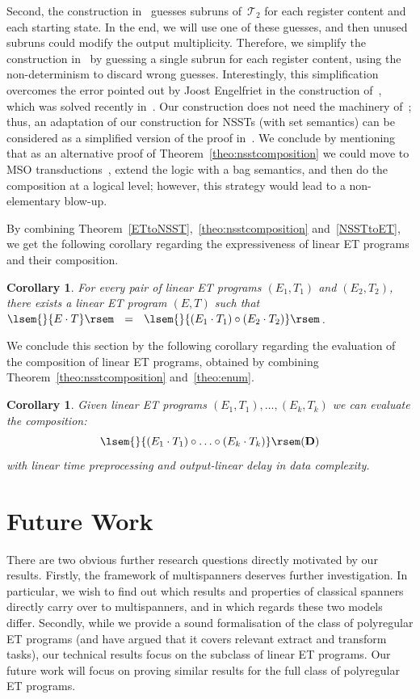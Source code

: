 \documentclass[
a4paper
]{article}
\theoremstyle{plain}
\newtheorem{corollary}[theorem]{Corollary}
\theoremstyle{definition}
\theoremstyle{remark}
\newcommand{\doc}{\ensuremath{\mathbf{D}}}
\newcommand{\nsst}{\mathcal{T}}
\newcommand{\sem}[1]{{\lsem{}{#1}\rsem}}
\begin{document}
Second, the construction in~\cite{AlurD11} guesses subruns of~$\nsst_2$ for each register content and each starting state. In the end, we will use one of these guesses, and then unused subruns could modify the output multiplicity. Therefore, we simplify the construction in~\cite{AlurD11} by guessing a single subrun for each register content, using the non-determinism to discard wrong guesses. Interestingly, this simplification overcomes the error pointed out by Joost Engelfriet in the construction of~\cite{AlurD11}, which was solved recently in~\cite{AlurD22}. Our construction does not need the machinery of~\cite{AlurD22}; thus, an adaptation of our construction for NSSTs (with set semantics) can be considered as a simplified version of the proof in~\cite{AlurD11,AlurD22}. 
We conclude by mentioning that as an alternative proof of Theorem~\ref{theo:nsstcomposition} we could move to MSO transductions~\cite{EngelfrietH01}, extend the logic with a bag semantics, and then do the composition at a logical level; however, this strategy would lead to a non-elementary blow-up.

By combining Theorem~\ref{ETtoNSST},~\ref{theo:nsstcomposition} and~\ref{NSSTtoET}, we get the following corollary regarding the expressiveness of linear ET programs and their composition.
\begin{corollary}
  For every pair of linear ET programs $(E_1, T_1)$ and $(E_2, T_2)$, there exists
  a linear
  ET program $(E,T)$ such that $\sem{E \cdot T} \ \ = \ \ \sem{(E_1 \cdot T_1) \circ (E_2 \cdot T_2)}$.
\end{corollary}
We conclude 
this section by 
the following corollary regarding the evaluation of
the
composition of
linear
ET programs, obtained by combining Theorem~\ref{theo:nsstcomposition} and~\ref{theo:enum}.
\begin{corollary}\label{cor:compAndEnum}
	Given linear ET programs $(E_1, T_1), \ldots, (E_k, T_k)$ we can evaluate the composition:
	\[
	\sem{(E_1 \cdot T_1) \circ \ldots \circ (E_k \cdot T_k)}(\doc)
	\] 
	with linear time preprocessing and output-linear delay in data complexity.
\end{corollary} 

\section{Future Work}\label{sec:conclusions}
	
There are two obvious further research questions directly motivated by our results. Firstly, the framework of multispanners deserves further investigation. In particular, we wish to find out which results and properties of classical spanners directly carry over to multispanners, and in which regards these two models differ. Secondly, while we provide a sound formalisation of the class of polyregular ET programs (and have argued that it covers relevant extract and transform tasks), our
technical
results focus on the subclass of linear ET programs.
Our future work will focus on proving similar results for the full class of polyregular ET programs. 
	
\end{document}
